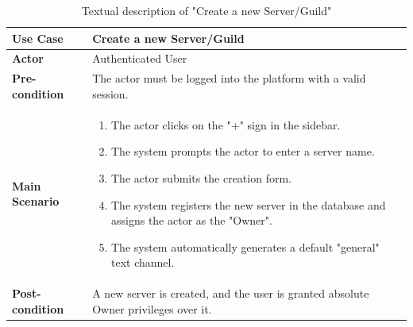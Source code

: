 \renewcommand{\arraystretch}{1.15}
\begin{table}[H]
    \centering
    \begin{tabular}{| p{3.5cm} | p{10.5cm} |}
        \hline
        \textbf{Use Case} & Create a new Server/Guild \\
        \hline
        \textbf{Actor} & Authenticated User \\
        \hline
        \textbf{Pre-condition} & The actor must be logged into the platform with a valid session. \\
        \hline
        \textbf{Main Scenario} & 
        \vspace{-0.3cm}
        \begin{minipage}[t]{10.5cm}
            \begin{enumerate}
                \item The actor clicks on the "+" sign in the sidebar.
                \item The system prompts the actor to enter a server name.
                \item The actor submits the creation form.
                \item The system registers the new server in the database and assigns the actor as the "Owner".
                \item The system automatically generates a default "general" text channel.
            \end{enumerate}
            \vspace{0.1cm}
        \end{minipage} \\
        \hline
        \textbf{Post-condition} & A new server is created, and the user is granted absolute Owner privileges over it. \\
        \hline
    \end{tabular}
    \vspace{0.2cm}
    \caption{Textual description of "Create a new Server/Guild"}
    \label{tab:usecase_create_server}
\end{table}


